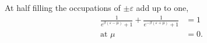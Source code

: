 \documentclass{article}
\begin{document}
At half filling the occupations of $\pm\varepsilon$ add up to one,
\begin{align}
\frac{1}{e^{\beta(\varepsilon-\mu)}+1} + \frac{1}{e^{-\beta(\varepsilon+\mu)}+1} &= 1 \nonumber\\
\text{at } \mu &= 0 .
\label{eq:ph}
\end{align}
\end{document}
